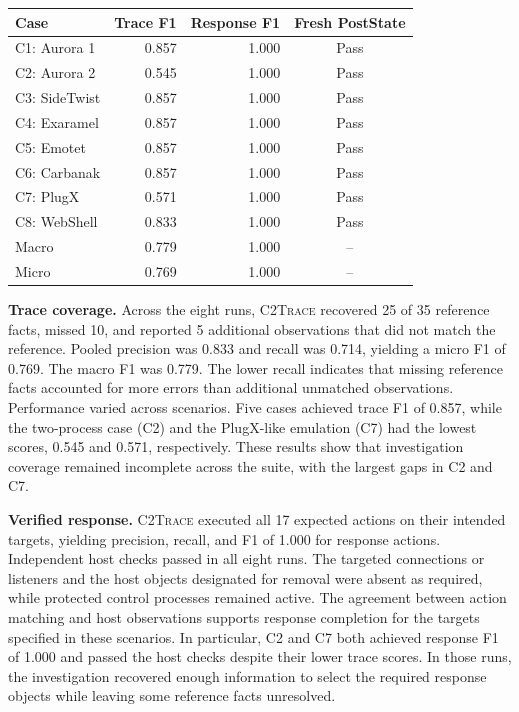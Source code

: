 \documentclass[pdflatex,sn-basic]{sn-jnl}
\newcommand{\system}{\textsc{C2Trace}\xspace}
\begin{document}
\begingroup
\let\table\tableorg
\let\endtable\endtableorg
\begin{table}[htbp]
\centering
\caption{Effectiveness of C2Trace across eight Windows C2 scenarios, with one trial per scenario.}
\label{tab:effectiveness}
\small
\renewcommand{\arraystretch}{1.15}
\setlength{\tabcolsep}{6pt}
\begin{tabular}{lrrc}
\toprule
\textbf{Case} & \textbf{Trace F1} & \textbf{Response F1} & \textbf{Fresh PostState} \\
\midrule
\rowcolor{black!6}
C1: Aurora 1 & 0.857 & 1.000 & Pass \\
C2: Aurora 2 & 0.545 & 1.000 & Pass \\
\rowcolor{black!6}
C3: SideTwist & 0.857 & 1.000 & Pass \\
C4: Exaramel & 0.857 & 1.000 & Pass \\
\rowcolor{black!6}
C5: Emotet & 0.857 & 1.000 & Pass \\
C6: Carbanak & 0.857 & 1.000 & Pass \\
\rowcolor{black!6}
C7: PlugX & 0.571 & 1.000 & Pass \\
C8: WebShell & 0.833 & 1.000 & Pass \\
\midrule
Macro & 0.779 & 1.000 & -- \\
Micro & 0.769 & 1.000 & -- \\
\bottomrule
\end{tabular}
\end{table}
\endgroup

\noindent\textbf{Trace coverage.} Across the eight runs, \system recovered 25 of 35 reference facts, missed 10, and reported 5 additional observations that did not match the reference. Pooled precision was 0.833 and recall was 0.714, yielding a micro F1 of 0.769. The macro F1 was 0.779. The lower recall indicates that missing reference facts accounted for more errors than additional unmatched observations. Performance varied across scenarios. Five cases achieved trace F1 of 0.857, while the two-process case (C2) and the PlugX-like emulation (C7) had the lowest scores, 0.545 and 0.571, respectively. These results show that investigation coverage remained incomplete across the suite, with the largest gaps in C2 and C7.

\noindent\textbf{Verified response.} \system executed all 17 expected actions on their intended targets, yielding precision, recall, and F1 of 1.000 for response actions. Independent host checks passed in all eight runs. The targeted connections or listeners and the host objects designated for removal were absent as required, while protected control processes remained active. The agreement between action matching and host observations supports response completion for the targets specified in these scenarios. In particular, C2 and C7 both achieved response F1 of 1.000 and passed the host checks despite their lower trace scores. In those runs, the investigation recovered enough information to select the required response objects while leaving some reference facts unresolved.
\end{document}
